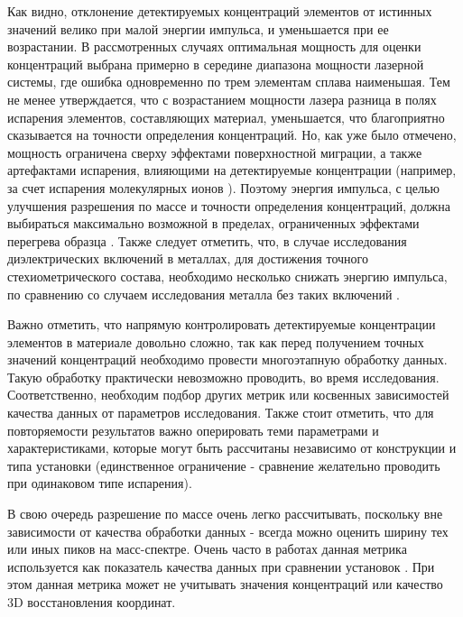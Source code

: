 Как видно, отклонение детектируемых концентраций элементов от истинных значений велико при малой энергии импульса, и уменьшается при ее возрастании. В рассмотренных случаях оптимальная мощность для оценки концентраций выбрана примерно в середине диапазона мощности лазерной системы, где ошибка одновременно по трем элементам сплава наименьшая. Тем не менее утверждается, что с возрастанием мощности лазера разница в полях испарения элементов, составляющих материал, уменьшается, что благоприятно сказывается на точности определения концентраций. Но, как уже было отмечено, мощность ограничена сверху эффектами поверхностной миграции, а также артефактами испарения, влияющими на детектируемые концентрации (например, за счет испарения молекулярных ионов \cite{Tu15}). Поэтому энергия импульса, с целью улучшения разрешения по массе и точности определения концентраций, должна выбираться максимально возможной в пределах, ограниченных эффектами перегрева образца \cite{Tu15}. Также следует отметить, что, в случае исследования диэлектрических включений в металлах, для достижения точного стехиометрического состава, необходимо несколько снижать энергию импульса, по сравнению со случаем исследования металла без таких включений \cite{LarsonBOOK}.


Важно отметить, что напрямую контролировать детектируемые концентрации элементов в материале довольно сложно, так как перед получением точных значений концентраций необходимо провести многоэтапную обработку данных. Такую обработку практически невозможно проводить, во время исследования. Соответственно, необходим подбор других метрик или косвенных зависимостей качества данных от параметров исследования. Также стоит отметить, что для повторяемости результатов важно оперировать теми параметрами и характеристиками, которые могут быть рассчитаны независимо от конструкции и типа установки (единственное ограничение - сравнение желательно проводить при одинаковом типе испарения).

В свою очередь разрешение по массе очень легко рассчитывать, поскольку вне зависимости от качества обработки данных - всегда можно оценить ширину тех или иных пиков на масс-спектре. Очень часто в работах данная метрика используется как показатель качества данных при сравнении установок \cite{Tegg23}. При этом данная метрика может не учитывать значения концентраций или качество 3D восстановления координат.

